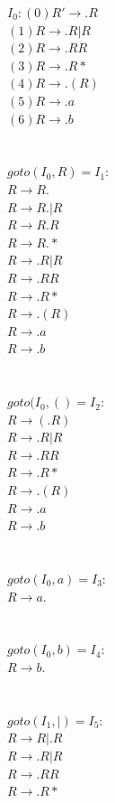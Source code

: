 \documentclass[10pt]{letter}
\begin{document}
\begin{enumerate}
$I_{0}: (0) R' \rightarrow .R$\\
$(1) R\rightarrow .R|R$\\
$(2) R \rightarrow .RR$\\
$(3) R \rightarrow .R*$\\
$(4) R \rightarrow .(R)$\\
$(5) R \rightarrow .a$\\
$(6) R \rightarrow .b$\\
\\
\\
$goto(I_{0},R)=I_{1}:$\\
$R \rightarrow R.$\\
$R \rightarrow R.|R$\\
$R \rightarrow R.R$\\
$R \rightarrow R.*$\\
$R \rightarrow .R|R$\\
$R \rightarrow .RR$\\
$R \rightarrow .R*$\\
$R \rightarrow .(R)$\\
$R \rightarrow .a$\\
$R \rightarrow .b$\\
\\
\\
$goto(I_{0},()=I_{2}:$\\
$R \rightarrow (.R)$\\
$R \rightarrow .R|R$\\
$R \rightarrow .RR$\\
$R \rightarrow .R*$\\
$R \rightarrow .(R)$\\
$R \rightarrow .a$\\
$R \rightarrow .b$\\
\\
\\
$goto(I_{0},a)=I_{3}:$\\
$R \rightarrow a.$\\
\\
\\
$goto(I_{0},b)=I_{4}:$\\
$R \rightarrow b.$\\
\\
\\
$goto(I_{1},|)=I_{5}:$\\
$R \rightarrow R|.R$ \\
$R \rightarrow .R|R$\\
$R \rightarrow .RR$\\
$R \rightarrow .R*$\\

\end{enumerate}
\end{document}

